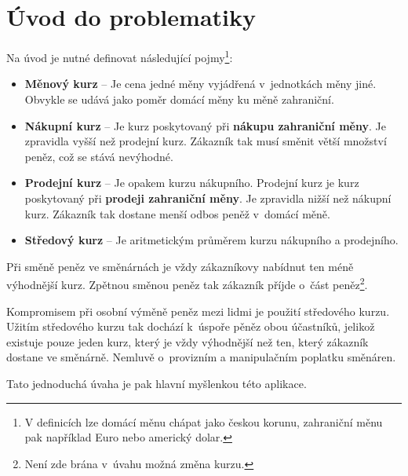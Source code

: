 \chapter{Úvod do problematiky}
\label{problematics}

Na úvod je nutné definovat následující pojmy\footnote{V definicích lze domácí měnu chápat jako českou korunu, zahraniční měnu pak například Euro nebo americký dolar.}:
\begin{itemize}
    \item \textbf{Měnový kurz} -- Je cena jedné měny vyjádřená v~jednotkách měny jiné. Obvykle se udává jako poměr domácí měny ku měně zahraniční.
    \item \textbf{Nákupní kurz} -- Je kurz poskytovaný při \textbf{nákupu zahraniční měny}. Je zpravidla vyšší než prodejní kurz. Zákazník tak musí směnit větší množství peněz, což se stává nevýhodné.
    \item \textbf{Prodejní kurz} -- Je opakem kurzu nákupního. Prodejní kurz je kurz poskytovaný při \textbf{prodeji zahraniční měny}. Je zpravidla nižší než nákupní kurz. Zákazník tak dostane menší odbos peněž v~domácí měně.
    \item \textbf{Středový kurz} -- Je aritmetickým průměrem kurzu nákupního a prodejního.
\end{itemize}

Při směně peněz ve směnárnách je vždy zákazníkovy nabídnut ten méně výhodnější kurz. Zpětnou směnou peněz tak zákazník příjde o~část peněz\footnote{Není zde brána v~úvahu možná změna kurzu.}.

Kompromisem při osobní výměně peněz mezi lidmi je použití středového kurzu. Užitím středového kurzu tak dochází k~úspoře pěněz obou účastníků, jelikož existuje pouze jeden kurz, který je vždy výhodnější než ten, který zákazník dostane ve směnárně. Nemluvě o~provizním a manipulačním poplatku směnáren.

Tato jednoduchá úvaha je pak hlavní myšlenkou této aplikace.
